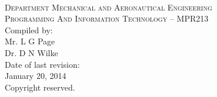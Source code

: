 \begin{titlepage}
    \thispagestyle{empty}
    \begin{center}
        \ \\
        \vspace{2cm}
        {\Large \textsc{Department Mechanical and Aeronautical
                        Engineering}} \\
        \vspace{1.5cm}
        {\huge \textsc{Programming And Information Technology -- MPR213}} \\
        \vspace{3cm}
        {\large Compiled by:} \\
        \vspace{0.2cm}
        {\large Mr. L G Page} \\
        {\large Dr. D N Wilke} \\
        \vspace{1cm}
        {\large Date of last revision:} \\
        \vspace{0.2cm}
        {\large January 20, 2014} \\
        \vspace{1cm}
        {\large Copyright reserved.} \\
    \end{center}
\end{titlepage}
